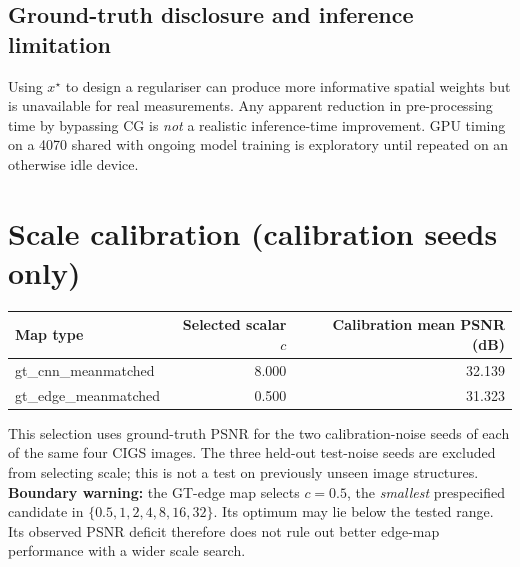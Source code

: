 \documentclass[11pt,a4paper]{article}
\begin{document}
\subsection{Ground-truth disclosure and inference limitation}
Using $x^\star$ to design a regulariser can produce more informative spatial weights but is unavailable for real measurements. Any apparent reduction in pre-processing time by bypassing CG is \emph{not} a realistic inference-time improvement. GPU timing on a 4070 shared with ongoing model training is exploratory until repeated on an otherwise idle device.
\section{Scale calibration (calibration seeds only)}
\begin{center}\begin{tabular}{lrr}\toprule Map type & Selected scalar $c$ & Calibration mean PSNR (dB)\\\midrule
gt\_cnn\_meanmatched & 8.000 & 32.139 \\
gt\_edge\_meanmatched & 0.500 & 31.323 \\
\bottomrule\end{tabular}\end{center}
This selection uses ground-truth PSNR for the two calibration-noise seeds of each of the same four CIGS images. The three held-out test-noise seeds are excluded from selecting scale; this is not a test on previously unseen image structures.
\textbf{Boundary warning:} the GT-edge map selects $c=0.5$, the \emph{smallest} prespecified candidate in $\{0.5,1,2,4,8,16,32\}$. Its optimum may lie below the tested range. Its observed PSNR deficit therefore does not rule out better edge-map performance with a wider scale search.
\end{document}
